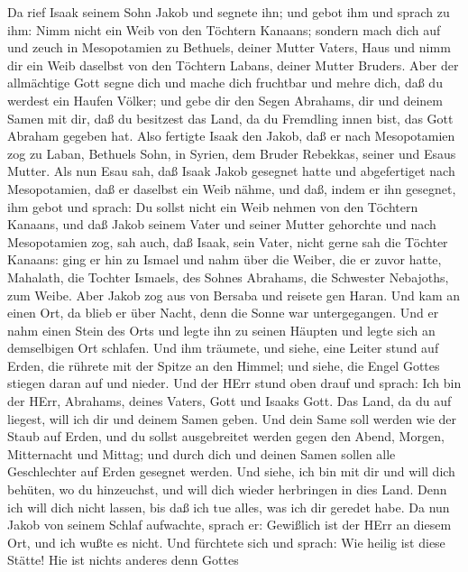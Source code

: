  Da rief Isaak seinem Sohn Jakob und segnete ihn; und gebot
ihm und sprach zu ihm: Nimm nicht ein Weib von den Töchtern Kanaans;
 sondern mach dich auf und zeuch in Mesopotamien zu
Bethuels, deiner Mutter Vaters, Haus und nimm dir ein Weib daselbst von
den Töchtern Labans, deiner Mutter Bruders.  Aber der
allmächtige Gott segne dich und mache dich fruchtbar und mehre dich, daß
du werdest ein Haufen Völker;  und gebe dir den Segen
Abrahams, dir und deinem Samen mit dir, daß du besitzest das Land, da du
Fremdling innen bist, das Gott Abraham gegeben hat.  Also
fertigte Isaak den Jakob, daß er nach Mesopotamien zog zu Laban,
Bethuels Sohn, in Syrien, dem Bruder Rebekkas, seiner und Esaus Mutter.
 Als nun Esau sah, daß Isaak Jakob gesegnet hatte und
abgefertiget nach Mesopotamien, daß er daselbst ein Weib nähme, und daß,
indem er ihn gesegnet, ihm gebot und sprach: Du sollst nicht ein Weib
nehmen von den Töchtern Kanaans,  und daß Jakob seinem Vater
und seiner Mutter gehorchte und nach Mesopotamien zog,  sah
auch, daß Isaak, sein Vater, nicht gerne sah die Töchter Kanaans:
 ging er hin zu Ismael und nahm über die Weiber, die er
zuvor hatte, Mahalath, die Tochter Ismaels, des Sohnes Abrahams, die
Schwester Nebajoths, zum Weibe.  Aber Jakob zog aus von
Bersaba und reisete gen Haran.  Und kam an einen Ort, da
blieb er über Nacht, denn die Sonne war untergegangen. Und er nahm einen
Stein des Orts und legte ihn zu seinen Häupten und legte sich an
demselbigen Ort schlafen.  Und ihm träumete, und siehe,
eine Leiter stund auf Erden, die rührete mit der Spitze an den Himmel;
und siehe, die Engel Gottes stiegen daran auf und nieder. 
Und der HErr stund oben drauf und sprach: Ich bin der HErr, Abrahams,
deines Vaters, Gott und Isaaks Gott. Das Land, da du auf liegest, will
ich dir und deinem Samen geben.  Und dein Same soll werden
wie der Staub auf Erden, und du sollst ausgebreitet werden gegen den
Abend, Morgen, Mitternacht und Mittag; und durch dich und deinen Samen
sollen alle Geschlechter auf Erden gesegnet werden.  Und
siehe, ich bin mit dir und will dich behüten, wo du hinzeuchst, und will
dich wieder herbringen in dies Land. Denn ich will dich nicht lassen,
bis daß ich tue alles, was ich dir geredet habe.  Da nun
Jakob von seinem Schlaf aufwachte, sprach er: Gewißlich ist der HErr an
diesem Ort, und ich wußte es nicht.  Und fürchtete sich und
sprach: Wie heilig ist diese Stätte! Hie ist nichts anderes denn Gottes
